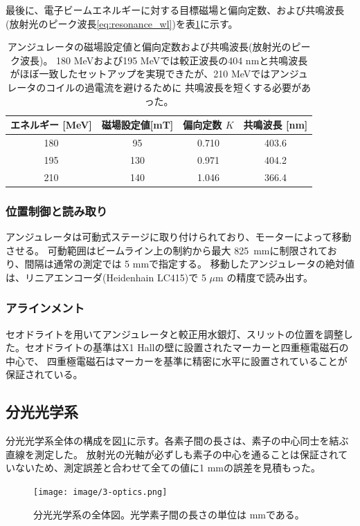 \documentclass[a4paper,11pt,uplatex]{jsbook}
\begin{document}
最後に、電子ビームエネルギーに対する目標磁場と偏向定数、および共鳴波長(放射光のピーク波長\ref{eq:resonance_wl})を表\ref{undulator_setting}に示す。
\begin{table}
  \begin{tabular}{|c|ccc|}
    エネルギー [MeV]& 磁場設定値[mT]&偏向定数 $K$&共鳴波長 [nm]\\ \hline
    180 & 95  & 0.710 & 403.6\\
    195 & 130 & 0.971 & 404.2\\
    210 & 140 & 1.046 & 366.4\\
  \end{tabular}
  \caption[アンジュレータの磁場設定値]{アンジュレータの磁場設定値と偏向定数および共鳴波長(放射光のピーク波長)。
  180 MeVおよび195 MeVでは較正波長の404 nmと共鳴波長がほぼ一致したセットアップを実現できたが、210 MeVではアンジュレータのコイルの過電流を避けるために
  共鳴波長を短くする必要があった。}\label{undulator_setting}
\end{table}

\subsubsection{位置制御と読み取り}
アンジュレータは可動式ステージに取り付けられており、モーターによって移動させる。
可動範囲はビームライン上の制約から最大 825~mmに制限されており、間隔は通常の測定では 5 mmで指定する。
移動したアンジュレータの絶対値は、リニアエンコーダ(Heidenhain LC415)で 5 $\mu \text{m}$ の精度で読み出す。

\subsubsection{アラインメント}
セオドライトを用いてアンジュレータと較正用水銀灯、スリットの位置を調整した。セオドライトの基準はX1 Hallの壁に設置されたマーカーと四重極電磁石の中心で、
四重極電磁石はマーカーを基準に精密に水平に設置されていることが保証されている。

\subsection{分光光学系}
分光光学系全体の構成を図\ref{fig:optics}に示す。各素子間の長さは、素子の中心同士を結ぶ直線を測定した。
放射光の光軸が必ずしも素子の中心を通ることは保証されていないため、測定誤差と合わせて全ての値に1 mmの誤差を見積もった。
\begin{figure}
  \centering
  \texttt{[image: image/3-optics.png]}\\
  \caption[分光光学系の全体図]{分光光学系の全体図。光学素子間の長さの単位は mmである。}
  \label{fig:optics}
\end{figure}
\end{document}
